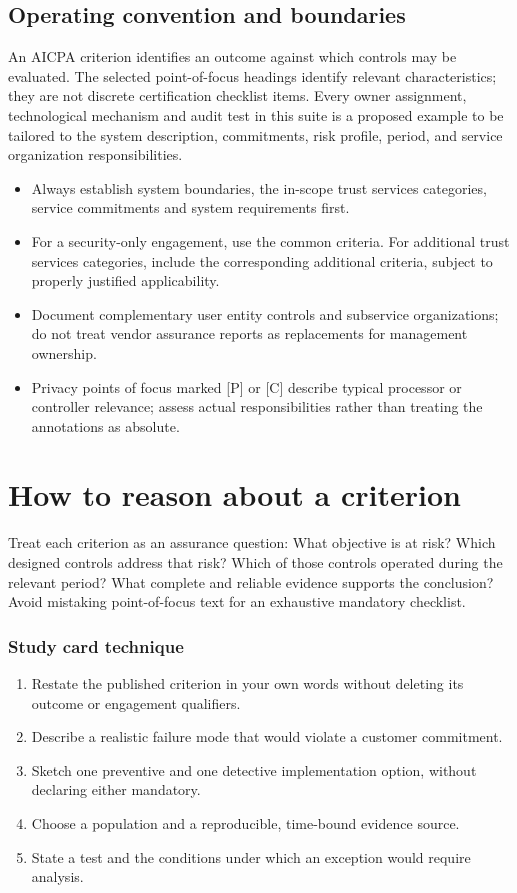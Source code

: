 \documentclass[10pt,oneside]{report}
\begin{document}
\section*{Operating convention and boundaries}
An AICPA criterion identifies an outcome against which controls may be evaluated. The selected point-of-focus headings identify relevant characteristics; they are not discrete certification checklist items. Every owner assignment, technological mechanism and audit test in this suite is a proposed example to be tailored to the system description, commitments, risk profile, period, and service organization responsibilities.

\begin{itemize}
\item Always establish system boundaries, the in-scope trust services categories, service commitments and system requirements first.
\item For a security-only engagement, use the common criteria. For additional trust services categories, include the corresponding additional criteria, subject to properly justified applicability.
\item Document complementary user entity controls and subservice organizations; do not treat vendor assurance reports as replacements for management ownership.
\item Privacy points of focus marked [P] or [C] describe typical processor or controller relevance; assess actual responsibilities rather than treating the annotations as absolute.
\end{itemize}

\chapter{How to reason about a criterion}
Treat each criterion as an assurance question: What objective is at risk? Which designed controls address that risk? Which of those controls operated during the relevant period? What complete and reliable evidence supports the conclusion? Avoid mistaking point-of-focus text for an exhaustive mandatory checklist.

\subsection{Study card technique}
\begin{enumerate}
\item Restate the published criterion in your own words without deleting its outcome or engagement qualifiers.
\item Describe a realistic failure mode that would violate a customer commitment.
\item Sketch one preventive and one detective implementation option, without declaring either mandatory.
\item Choose a population and a reproducible, time-bound evidence source.
\item State a test and the conditions under which an exception would require analysis.
\end{enumerate}
\end{document}
